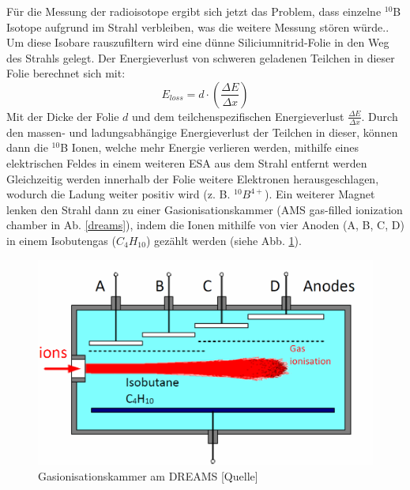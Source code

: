 Für die Messung der radioisotope ergibt sich jetzt das Problem, dass einzelne $^{10}$B Isotope aufgrund im Strahl verbleiben, was die weitere Messung stören würde..
Um diese Isobare rauszufiltern wird eine dünne Siliciumnitrid-Folie in den Weg des Strahls gelegt.
Der Energieverlust von schweren geladenen Teilchen in dieser Folie berechnet sich mit:
\begin{equation}
E_{loss} = d \cdot \left( \frac{\Delta E}{\Delta x} \right)
\end{equation}
Mit der Dicke der Folie $d$ und dem teilchenspezifischen Energieverlust $\frac{\Delta E}{\Delta x}$.
Durch den massen- und ladungsabhängige Energieverlust der Teilchen in dieser, können dann die $^{10}$B Ionen, welche mehr Energie verlieren werden, mithilfe eines elektrischen Feldes in einem weiteren ESA aus dem Strahl entfernt werden
Gleichzeitig werden innerhalb der Folie weitere Elektronen herausgeschlagen, wodurch die Ladung weiter positiv wird (z. B. $^{10}B^{4+}$).
Ein weiterer Magnet lenken den Strahl dann zu einer Gasionisationskammer (AMS gas-filled ionization chamber in Ab. \ref{dreams}), indem die Ionen mithilfe von vier Anoden (A, B, C, D) in einem Isobutengas ($C_{4}H_{10}$) gezählt werden (siehe Abb. \ref{ion_chamber}).
\begin{figure}[ht]
  \includegraphics[width=\linewidth]{../Bilder/ion_chamber.png}
  \caption{Gasionisationskammer am DREAMS [Quelle]}
  \label{ion_chamber}
\end{figure}
\clearpage
